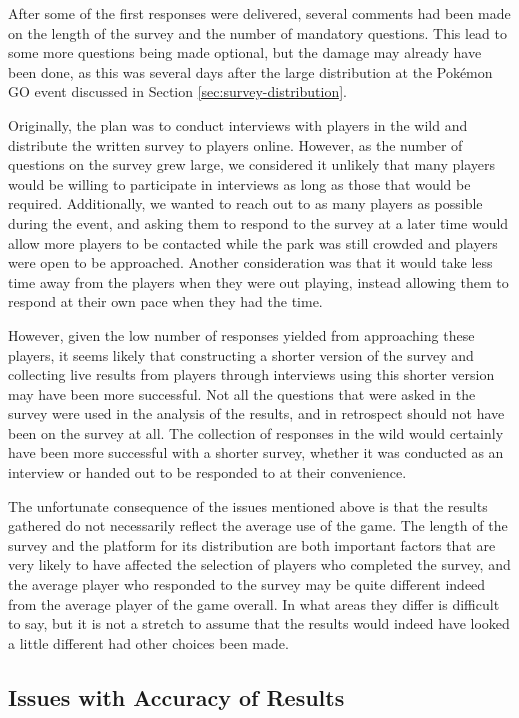 After some of the first responses were delivered, several comments had been made on the length of the survey and the number of mandatory questions. This lead to some more questions being made optional, but the damage may already have been done, as this was several days after the large distribution at the Pokémon GO event discussed in Section \ref{sec:survey-distribution}.

Originally, the plan was to conduct interviews with players in the wild and distribute the written survey to players online. However, as the number of questions on the survey grew large, we considered it unlikely that many players would be willing to participate in interviews as long as those that would be required. Additionally, we wanted to reach out to as many players as possible during the event, and asking them to respond to the survey at a later time would allow more players to be contacted while the park was still crowded and players were open to be approached. Another consideration was that it would take less time away from the players when they were out playing, instead allowing them to respond at their own pace when they had the time.

However, given the low number of responses yielded from approaching these players, it seems likely that constructing a shorter version of the survey and collecting live results from players through interviews using this shorter version may have been more successful. Not all the questions that were asked in the survey were used in the analysis of the results, and in retrospect should not have been on the survey at all. The collection of responses in the wild would certainly have been more successful with a shorter survey, whether it was conducted as an interview or handed out to be responded to at their convenience.

The unfortunate consequence of the issues mentioned above is that the results gathered do not necessarily reflect the average use of the game. The length of the survey and the platform for its distribution are both important factors that are very likely to have affected the selection of players who completed the survey, and the average player who responded to the survey may be quite different indeed from the average player of the game overall. In what areas they differ is difficult to say, but it is not a stretch to assume that the results would indeed have looked a little different had other choices been made.

\subsection{Issues with Accuracy of Results}


